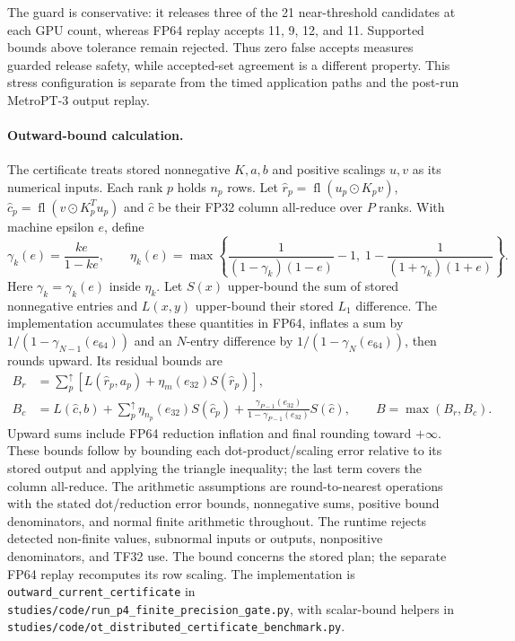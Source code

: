 The guard is conservative: it releases three of the 21 near-threshold candidates at each GPU count, whereas FP64 replay accepts 11, 9, 12, and 11. Supported bounds above tolerance remain rejected. Thus zero false accepts measures guarded release safety, while accepted-set agreement is a different property. This stress configuration is separate from the timed application paths and the post-run MetroPT-3 output replay.

\paragraph{Outward-bound calculation.}
The certificate treats stored nonnegative $K,a,b$ and positive scalings $u,v$ as its numerical inputs. Each rank $p$ holds $n_p$ rows. Let $\widehat r_p=\operatorname{fl}(u_p\odot K_pv)$, $\widehat c_p=\operatorname{fl}(v\odot K_p^Tu_p)$ and $\widehat c$ be their FP32 column all-reduce over $P$ ranks. With machine epsilon $e$, define
\[
\gamma_k(e)=\frac{ke}{1-ke},\qquad
\eta_k(e)=\max\!\left\{\frac{1}{(1-\gamma_k)(1-e)}-1,\;1-\frac{1}{(1+\gamma_k)(1+e)}\right\}.
\]
Here $\gamma_k=\gamma_k(e)$ inside $\eta_k$. Let $S(x)$ upper-bound the sum of stored nonnegative entries and $L(x,y)$ upper-bound their stored $L_1$ difference. The implementation accumulates these quantities in FP64, inflates a sum by $1/(1-\gamma_{N-1}(e_{64}))$ and an $N$-entry difference by $1/(1-\gamma_N(e_{64}))$, then rounds upward. Its residual bounds are
\[
\begin{aligned}
B_r&=\sum_p^{\uparrow}\left[L(\widehat r_p,a_p)+\eta_m(e_{32})S(\widehat r_p)\right],\\
B_c&=L(\widehat c,b)+\sum_p^{\uparrow}\eta_{n_p}(e_{32})S(\widehat c_p)
+\frac{\gamma_{P-1}(e_{32})}{1-\gamma_{P-1}(e_{32})}S(\widehat c),\qquad
B=\max(B_r,B_c).
\end{aligned}
\]
Upward sums include FP64 reduction inflation and final rounding toward $+\infty$. These bounds follow by bounding each dot-product/scaling error relative to its stored output and applying the triangle inequality; the last term covers the column all-reduce. The arithmetic assumptions are round-to-nearest operations with the stated dot/reduction error bounds, nonnegative sums, positive bound denominators, and normal finite arithmetic throughout. The runtime rejects detected non-finite values, subnormal inputs or outputs, nonpositive denominators, and TF32 use. The bound concerns the stored plan; the separate FP64 replay recomputes its row scaling. The implementation is \texttt{outward\_current\_certificate} in \texttt{studies/code/run\_p4\_finite\_precision\_gate.py}, with scalar-bound helpers in \texttt{studies/code/ot\_distributed\_certificate\_benchmark.py}.

